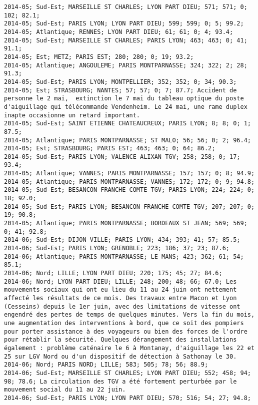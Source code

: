 \documentclass{article}
\begin{document}
\begin{Verbatim}[commandchars=\\\{\}]
2014-05; Sud-Est; MARSEILLE ST CHARLES; LYON PART DIEU; 571; 571; 0; 102; 82.1; 
2014-05; Sud-Est; PARIS LYON; LYON PART DIEU; 599; 599; 0; 5; 99.2; 
2014-05; Atlantique; RENNES; LYON PART DIEU; 61; 61; 0; 4; 93.4; 
2014-05; Sud-Est; MARSEILLE ST CHARLES; PARIS LYON; 463; 463; 0; 41; 91.1; 
2014-05; Est; METZ; PARIS EST; 280; 280; 0; 19; 93.2; 
2014-05; Atlantique; ANGOULEME; PARIS MONTPARNASSE; 324; 322; 2; 28; 91.3; 
2014-05; Sud-Est; PARIS LYON; MONTPELLIER; 352; 352; 0; 34; 90.3; 
2014-05; Est; STRASBOURG; NANTES; 57; 57; 0; 7; 87.7; Accident de personne le 2 mai,  extinction le 7 mai du tableau optique du poste d'aiguillage qui télécommande Vendenheim. Le 24 mai, une rame duplex inapte occasionne un retard important.
2014-05; Sud-Est; SAINT ETIENNE CHATEAUCREUX; PARIS LYON; 8; 8; 0; 1; 87.5; 
2014-05; Atlantique; PARIS MONTPARNASSE; ST MALO; 56; 56; 0; 2; 96.4; 
2014-05; Est; STRASBOURG; PARIS EST; 463; 463; 0; 64; 86.2; 
2014-05; Sud-Est; PARIS LYON; VALENCE ALIXAN TGV; 258; 258; 0; 17; 93.4; 
2014-05; Atlantique; VANNES; PARIS MONTPARNASSE; 157; 157; 0; 8; 94.9; 
2014-05; Atlantique; PARIS MONTPARNASSE; VANNES; 172; 172; 0; 9; 94.8; 
2014-05; Sud-Est; BESANCON FRANCHE COMTE TGV; PARIS LYON; 224; 224; 0; 18; 92.0; 
2014-05; Sud-Est; PARIS LYON; BESANCON FRANCHE COMTE TGV; 207; 207; 0; 19; 90.8; 
2014-05; Atlantique; PARIS MONTPARNASSE; BORDEAUX ST JEAN; 569; 569; 0; 41; 92.8; 
2014-06; Sud-Est; DIJON VILLE; PARIS LYON; 434; 393; 41; 57; 85.5; 
2014-06; Sud-Est; PARIS LYON; GRENOBLE; 223; 186; 37; 23; 87.6; 
2014-06; Atlantique; PARIS MONTPARNASSE; LE MANS; 423; 362; 61; 54; 85.1; 
2014-06; Nord; LILLE; LYON PART DIEU; 220; 175; 45; 27; 84.6; 
2014-06; Nord; LYON PART DIEU; LILLE; 248; 200; 48; 66; 67.0; Les mouvements sociaux qui ont eu lieu du 11 au 24 juin ont nettement affecté les résultats de ce mois. Des travaux entre Macon et Lyon (Cesseins) depuis le 1er juin, avec des limitations de vitesse ont engendré des pertes de temps de quelques minutes. Vers la fin du mois, une augmentation des interventions à bord, que ce soit des pompiers pour porter assistance à des voyageurs ou bien des forces de l'ordre pour rétablir la sécurité. Quelques dérangement des installations également : problème caténaire le 6 à Montanay, d'aiguillage les 22 et 25 sur LGV Nord ou d'un dispositif de détection à Sathonay le 30.
2014-06; Nord; PARIS NORD; LILLE; 583; 505; 78; 56; 88.9; 
2014-06; Sud-Est; MARSEILLE ST CHARLES; LYON PART DIEU; 552; 458; 94; 98; 78.6; La circulation des TGV a été fortement perturbée par le mouvement social du 11 au 22 juin.
2014-06; Sud-Est; PARIS LYON; LYON PART DIEU; 570; 516; 54; 27; 94.8; 

\end{Verbatim}
\end{document}
